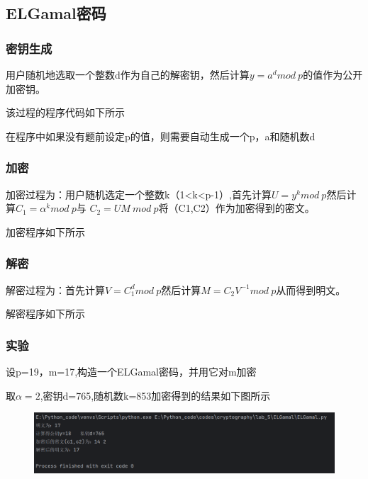 \documentclass[a4paper,11pt,UTF8]{ctexart}
\newcommand{\bottomcaption}{%
\setlength{\abovecaptionskip}{6pt}%
\setlength{\belowcaptionskip}{6pt}%
\caption}
\newcommand{\xiaowuhao}{\fontsize{9pt}{\baselineskip}\selectfont}   %
\begin{document}
    \subsection{ELGamal密码}

        \subsubsection{密钥生成}
            用户随机地选取一个整数d作为自己的解密钥，然后计算$y=a^{d}mod\ p$的值作为公开加密钥。\par
            该过程的程序代码如下所示
            
            在程序中如果没有题前设定p的值，则需要自动生成一个p，a和随机数d
\newpage
        \subsubsection{加密}
            加密过程为：用户随机选定一个整数k（1<k<p-1）,首先计算$U=y^{k}mod\ p$然后计算$C_{1}=\alpha ^{k}mod\ p$与
            $C_{2}=UM\ mod\ p$将（C1,C2）作为加密得到的密文。\par
            加密程序如下所示
            

        \subsubsection{解密}
            解密过程为：首先计算$V=C_{1}^{d}mod\ p$然后计算$M=C_{2}V^{-1}mod\ p$从而得到明文。\par
            解密程序如下所示
            
            
        \subsubsection{实验}
            设p=19，m=17,构造一个ELGamal密码，并用它对m加密\par
            取$\alpha =2$,密钥d=765,随机数k=853加密得到的结果如下图所示
            \begin{figure}[H]
                \centering
                \includegraphics[width=13cm]{EL_result1.png}
                \bottomcaption{\xiaowuhao{测试算法1运行结果}}
            \end{figure}
\end{document}
